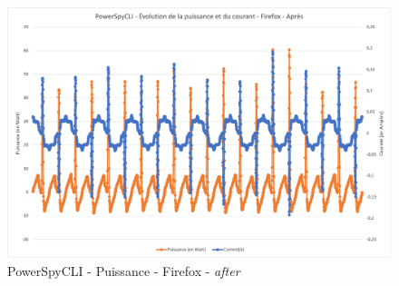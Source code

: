 \documentclass[12pt, a4paper]{report}
\begin{document}
\begin{figure}[H]
    \includegraphics[width=1\linewidth]{res//graph/PowerSpyCLI/Puissance_ff_apres.png}
    \caption{PowerSpyCLI - Puissance - Firefox - \textit{after}}
    \label{fig:pscli_power_ff_after}
\end{figure}
\end{document}
